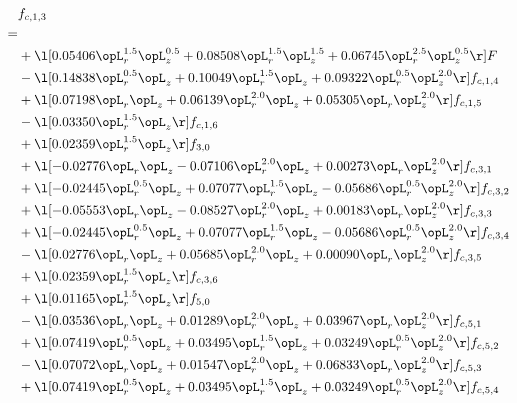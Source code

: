 \begin{alignat}{2} 
\label{eq:f_13_2} 
& f_{c,1,3} \nonumber \\ 
 = \\ 
& + \l[  0.05406 \opL_r^{1.5} \opL_z^{0.5} +  0.08508 \opL_r^{1.5} \opL_z^{1.5} +  0.06745 \opL_r^{2.5} \opL_z^{0.5}  \r] F \nonumber \\ 
& - \l[  0.14838 \opL_r^{0.5} \opL_z +  0.10049 \opL_r^{1.5} \opL_z +  0.09322 \opL_r^{0.5} \opL_z^{2.0}  \r] f_{c,1,4} \nonumber \\ 
& + \l[  0.07198 \opL_r \opL_z +  0.06139 \opL_r^{2.0} \opL_z +  0.05305 \opL_r \opL_z^{2.0}  \r] f_{c,1,5} \nonumber \\ 
& - \l[  0.03350 \opL_r^{1.5} \opL_z  \r] f_{c,1,6} \nonumber \\ 
& + \l[  0.02359 \opL_r^{1.5} \opL_z  \r] f_{3,0} \nonumber \\ 
& + \l[  -0.02776 \opL_r \opL_z   -0.07106 \opL_r^{2.0} \opL_z +  0.00273 \opL_r \opL_z^{2.0}  \r] f_{c,3,1} \nonumber \\ 
& + \l[  -0.02445 \opL_r^{0.5} \opL_z +  0.07077 \opL_r^{1.5} \opL_z   -0.05686 \opL_r^{0.5} \opL_z^{2.0}  \r] f_{c,3,2} \nonumber \\ 
& + \l[  -0.05553 \opL_r \opL_z   -0.08527 \opL_r^{2.0} \opL_z +  0.00183 \opL_r \opL_z^{2.0}  \r] f_{c,3,3} \nonumber \\ 
& + \l[  -0.02445 \opL_r^{0.5} \opL_z +  0.07077 \opL_r^{1.5} \opL_z   -0.05686 \opL_r^{0.5} \opL_z^{2.0}  \r] f_{c,3,4} \nonumber \\ 
& - \l[  0.02776 \opL_r \opL_z +  0.05685 \opL_r^{2.0} \opL_z +  0.00090 \opL_r \opL_z^{2.0}  \r] f_{c,3,5} \nonumber \\ 
& + \l[  0.02359 \opL_r^{1.5} \opL_z  \r] f_{c,3,6} \nonumber \\ 
& + \l[  0.01165 \opL_r^{1.5} \opL_z  \r] f_{5,0} \nonumber \\ 
& - \l[  0.03536 \opL_r \opL_z +  0.01289 \opL_r^{2.0} \opL_z +  0.03967 \opL_r \opL_z^{2.0}  \r] f_{c,5,1} \nonumber \\ 
& + \l[  0.07419 \opL_r^{0.5} \opL_z +  0.03495 \opL_r^{1.5} \opL_z +  0.03249 \opL_r^{0.5} \opL_z^{2.0}  \r] f_{c,5,2} \nonumber \\ 
& - \l[  0.07072 \opL_r \opL_z +  0.01547 \opL_r^{2.0} \opL_z +  0.06833 \opL_r \opL_z^{2.0}  \r] f_{c,5,3} \nonumber \\ 
& + \l[  0.07419 \opL_r^{0.5} \opL_z +  0.03495 \opL_r^{1.5} \opL_z +  0.03249 \opL_r^{0.5} \opL_z^{2.0}  \r] f_{c,5,4} \nonumber \\ 

\end{alignat}
